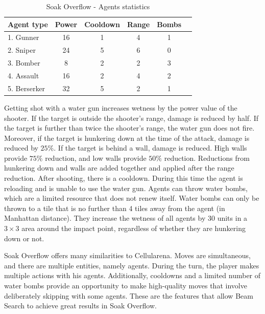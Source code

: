\documentclass[shortabstract, mgr, english]{iithesis}
\begin{document}
\begin{table}[H]
\centering
\begin{tabular}{lccccc}
\toprule
\textbf{Agent type} & \textbf{Power} & \textbf{Cooldown} & \textbf{Range} & \textbf{Bombs} \\
\midrule
1. Gunner    & 16 & 1 & 4 & 1\\
2. Sniper    & 24 & 5 & 6 & 0\\
3. Bomber    & 8  & 2 & 2 & 3\\
4. Assault   & 16 & 2 & 4 & 2\\
5. Berserker & 32 & 5 & 2 & 1\\
\bottomrule
\end{tabular}
\caption{Soak Overflow - Agents statistics}
\label{table:soakoverflow_agents}
\end{table}

Getting shot with a water gun increases wetness by the power value of the shooter. If the target is outside the shooter's range, damage is reduced by half. If the target is further than twice the shooter's range, the water gun does not fire. Moreover, if the target is hunkering down at the time of the attack, damage is reduced by $25\%$. If the target is behind a wall, damage is reduced. High walls provide $75\%$ reduction, and low walls provide $50\%$ reduction. Reductions from hunkering down and walls are added together and applied after the range reduction. After shooting, there is a cooldown. During this time the agent is reloading and is unable to use the water gun. Agents can throw water bombs, which are a limited resource that does not renew itself. Water bombs can only be thrown to a tile that is no further than 4 tiles away from the agent (in Manhattan distance). They increase the wetness of all agents by 30 units in a $3 \times 3$ area around the impact point, regardless of whether they are hunkering down or not.

Soak Overflow offers many similarities to Cellularena. Moves are simultaneous, and there are multiple entities, namely agents. During the turn, the player makes multiple actions with his agents. Additionally, cooldowns and a limited number of water bombs provide an opportunity to make high-quality moves that involve deliberately skipping with some agents. These are the features that allow Beam Search to achieve great results in Soak Overflow.
\end{document}
